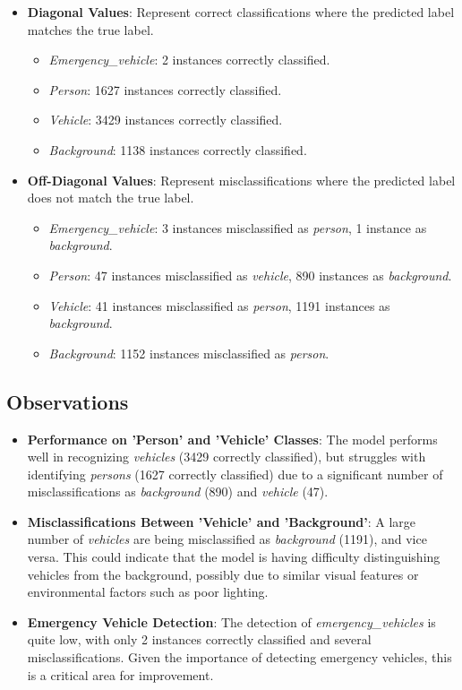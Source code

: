 \documentclass[usenatbib]{tjaa}
\begin{document}
\begin{itemize}
    \item \textbf{Diagonal Values}: Represent correct classifications where the predicted label matches the true label.
    \begin{itemize}
        \item \textit{Emergency\_vehicle}: 2 instances correctly classified.
        \item \textit{Person}: 1627 instances correctly classified.
        \item \textit{Vehicle}: 3429 instances correctly classified.
        \item \textit{Background}: 1138 instances correctly classified.
    \end{itemize}
    
    \item \textbf{Off-Diagonal Values}: Represent misclassifications where the predicted label does not match the true label.
    \begin{itemize}
        \item \textit{Emergency\_vehicle}: 3 instances misclassified as \textit{person}, 1 instance as \textit{background}.
        \item \textit{Person}: 47 instances misclassified as \textit{vehicle}, 890 instances as \textit{background}.
        \item \textit{Vehicle}: 41 instances misclassified as \textit{person}, 1191 instances as \textit{background}.
        \item \textit{Background}: 1152 instances misclassified as \textit{person}.
    \end{itemize}
\end{itemize}

\subsection{Observations}
\begin{itemize}
    \item \textbf{Performance on 'Person' and 'Vehicle' Classes}: The model performs well in recognizing \textit{vehicles} (3429 correctly classified), but struggles with identifying \textit{persons} (1627 correctly classified) due to a significant number of misclassifications as \textit{background} (890) and \textit{vehicle} (47).
    
    \item \textbf{Misclassifications Between 'Vehicle' and 'Background'}: A large number of \textit{vehicles} are being misclassified as \textit{background} (1191), and vice versa. This could indicate that the model is having difficulty distinguishing vehicles from the background, possibly due to similar visual features or environmental factors such as poor lighting.

    \item \textbf{Emergency Vehicle Detection}: The detection of \textit{emergency\_vehicles} is quite low, with only 2 instances correctly classified and several misclassifications. Given the importance of detecting emergency vehicles, this is a critical area for improvement.

\end{itemize}
\end{document}

